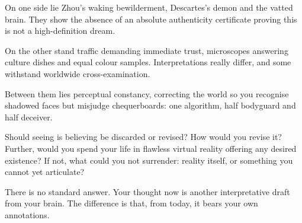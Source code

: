 On one side lie Zhou's waking bewilderment, Descartes's demon and the vatted brain. They show the absence of an absolute authenticity certificate proving this is not a high-definition dream.

On the other stand traffic demanding immediate trust, microscopes answering culture dishes and equal colour samples. Interpretations really differ, and some withstand worldwide cross-examination.

Between them lies perceptual constancy, correcting the world so you recognise shadowed faces but misjudge chequerboards: one algorithm, half bodyguard and half deceiver.

Should seeing is believing be discarded or revised? How would you revise it? Further, would you spend your life in flawless virtual reality offering any desired existence? If not, what could you not surrender: reality itself, or something you cannot yet articulate?

There is no standard answer. Your thought now is another interpretative draft from your brain. The difference is that, from today, it bears your own annotations.
